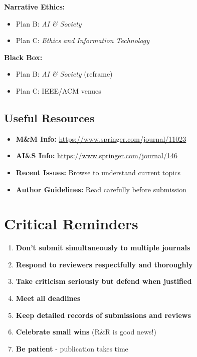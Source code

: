 \documentclass[12pt]{article}
\begin{document}
\textbf{Narrative Ethics:}
\begin{itemize}[itemsep=0pt]
\item Plan B: \textit{AI \& Society}
\item Plan C: \textit{Ethics and Information Technology}
\end{itemize}

\textbf{Black Box:}
\begin{itemize}[itemsep=0pt]
\item Plan B: \textit{AI \& Society} (reframe)
\item Plan C: IEEE/ACM venues
\end{itemize}

\subsection*{Useful Resources}

\begin{itemize}[itemsep=0pt]
\item \textbf{M\&M Info:} \url{https://www.springer.com/journal/11023}
\item \textbf{AI\&S Info:} \url{https://www.springer.com/journal/146}
\item \textbf{Recent Issues:} Browse to understand current topics
\item \textbf{Author Guidelines:} Read carefully before submission
\end{itemize}

\section*{Critical Reminders}

\begin{enumerate}[itemsep=0pt]
\item \textbf{Don't submit simultaneously to multiple journals}
\item \textbf{Respond to reviewers respectfully and thoroughly}
\item \textbf{Take criticism seriously but defend when justified}
\item \textbf{Meet all deadlines}
\item \textbf{Keep detailed records of submissions and reviews}
\item \textbf{Celebrate small wins} (R\&R is good news!)
\item \textbf{Be patient} - publication takes time
\end{enumerate}
\end{document}

